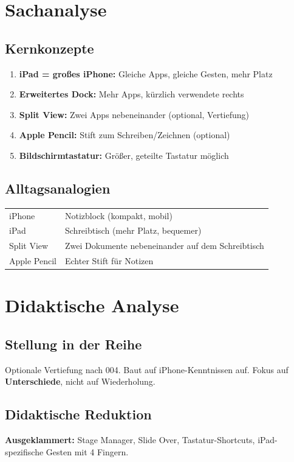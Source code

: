 \documentclass[11pt,a4paper]{article}
\begin{document}
\section{Sachanalyse}

\subsection{Kernkonzepte}
\begin{enumerate}
    \item \textbf{iPad = großes iPhone:} Gleiche Apps, gleiche Gesten, mehr Platz
    \item \textbf{Erweitertes Dock:} Mehr Apps, kürzlich verwendete rechts
    \item \textbf{Split View:} Zwei Apps nebeneinander (optional, Vertiefung)
    \item \textbf{Apple Pencil:} Stift zum Schreiben/Zeichnen (optional)
    \item \textbf{Bildschirmtastatur:} Größer, geteilte Tastatur möglich
\end{enumerate}

\subsection{Alltagsanalogien}
\begin{tabular}{|l|l|}
\hline
iPhone & Notizblock (kompakt, mobil) \\
iPad & Schreibtisch (mehr Platz, bequemer) \\
Split View & Zwei Dokumente nebeneinander auf dem Schreibtisch \\
Apple Pencil & Echter Stift für Notizen \\
\hline
\end{tabular}

\section{Didaktische Analyse}

\subsection{Stellung in der Reihe}
Optionale Vertiefung nach 004. Baut auf iPhone-Kenntnissen auf. Fokus auf \textbf{Unterschiede}, nicht auf Wiederholung.

\subsection{Didaktische Reduktion}
\textbf{Ausgeklammert:} Stage Manager, Slide Over, Tastatur-Shortcuts, iPad-spezifische Gesten mit 4 Fingern.
\end{document}
